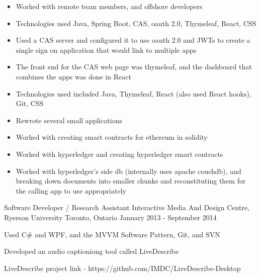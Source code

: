 \begin{cventries}
{\begin{cvitems}
{\begin{itemize}
                    \item {Worked with remote team members, and offshore developers}
                \end{itemize}
            }
            \item[] {
                \begin{itemize}
                    \item {Technologies used Java, Spring Boot, CAS, oauth 2.0, Thymeleaf, React, CSS}
                    \item {Used a CAS server and configured it to use oauth 2.0 and JWTs to create a single sign on application that would link to multiple apps}
                    \item {The front end for the CAS web page was thymeleaf, and the dashboard that combines the apps was done in React}
                \end{itemize}
            }
            \item[] {
                \begin{itemize}
                    \item {Technologies used included Java, Thymeleaf, React (also used React hooks), Git, CSS}
                    \item {Rewrote several small applications}
                \end{itemize}
            }
            \item[] {
                \begin{itemize}
                    \item {Worked with creating smart contracts for ethereum in solidity}
                    \item {Worked with hyperledger and creating hyperledger smart contracts}
                    \item {Worked with hyperledger's side db (internally uses apache couchdb),
                        and breaking down documents into smaller chunks and reconstituting them for the calling app to use appropriately}
                \end{itemize}
            }
        \end{cvitems}
    }

    \cventry
    {Software Developer / Research Assistant}
    {Interactive Media And Design Centre, Ryerson University}
    {Toronto, Ontario}
    {January 2013 - September 2014}
    {
        \begin{cvitems}
            \item {Used C\# and WPF, and the MVVM Software Pattern, Git, and SVN}
            \item {Developed an audio captioniong tool called LiveDescribe}
            \item {LiveDescribe project link - https://github.com/IMDC/LiveDescribe-Desktop}
        \end{cvitems}
    }
\end{cventries}